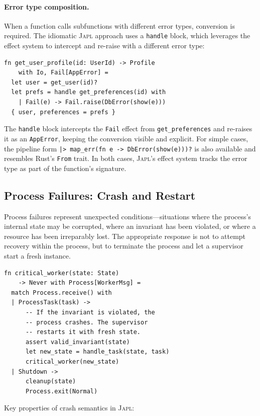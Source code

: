 \documentclass[11pt,twocolumn]{article}
\newcommand{\japl}{\textsc{Japl}}
\newcommand{\Fail}{\texttt{Fail}}
\begin{document}
\paragraph{Error type composition.} When a function calls subfunctions with different error types, conversion is required. The idiomatic \japl{} approach uses a \texttt{handle} block, which leverages the effect system to intercept and re-raise with a different error type:

\begin{lstlisting}
fn get_user_profile(id: UserId) -> Profile
    with Io, Fail[AppError] =
  let user = get_user(id)?
  let prefs = handle get_preferences(id) with
    | Fail(e) -> Fail.raise(DbError(show(e)))
  { user, preferences = prefs }
\end{lstlisting}

The \texttt{handle} block intercepts the \Fail{} effect from \texttt{get\_preferences} and re-raises it as an \texttt{AppError}, keeping the conversion visible and explicit. For simple cases, the pipeline form \texttt{|> map\_err(fn e -> DbError(show(e)))?} is also available and resembles Rust's \texttt{From} trait. In both cases, \japl{}'s effect system tracks the error type as part of the function's signature.

\subsection{Process Failures: Crash and Restart}

Process failures represent unexpected conditions---situations where the process's internal state may be corrupted, where an invariant has been violated, or where a resource has been irreparably lost. The appropriate response is not to attempt recovery within the process, but to terminate the process and let a supervisor start a fresh instance.

\begin{lstlisting}
fn critical_worker(state: State)
    -> Never with Process[WorkerMsg] =
  match Process.receive() with
  | ProcessTask(task) ->
      -- If the invariant is violated, the
      -- process crashes. The supervisor
      -- restarts it with fresh state.
      assert valid_invariant(state)
      let new_state = handle_task(state, task)
      critical_worker(new_state)
  | Shutdown ->
      cleanup(state)
      Process.exit(Normal)
\end{lstlisting}

Key properties of crash semantics in \japl{}:
\end{document}
